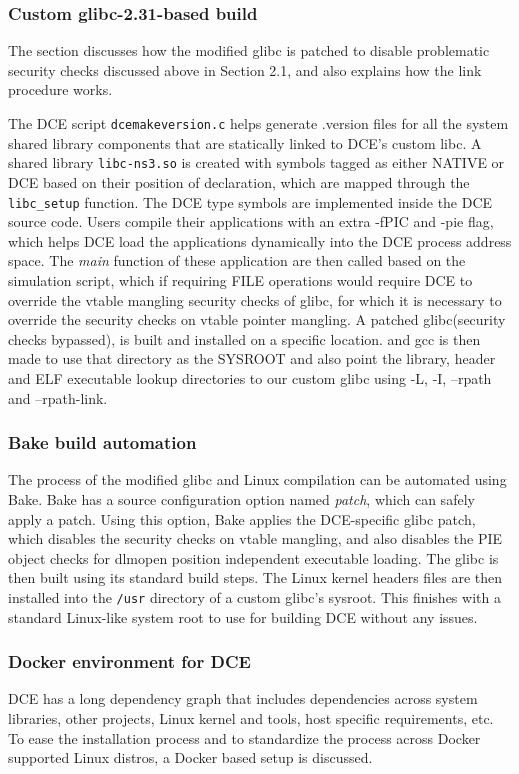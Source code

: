 \documentclass{sig-alternate}
\begin{document}
\subsubsection{Custom glibc-2.31-based build}
The section discusses how the modified glibc is patched to disable problematic security checks discussed above in Section 2.1, and also
explains how the link procedure works.

The DCE script \texttt{dcemakeversion.c} helps generate .version files for all the system shared library components that are statically linked to DCE's custom libc. A 
shared library \texttt{libc-ns3.so} is created with symbols tagged as either NATIVE or DCE based on their position of declaration, which are mapped through the 
\texttt{libc\_setup} function. The DCE type symbols are implemented 
inside the DCE source code. Users compile their applications with an extra -fPIC and -pie flag, which helps DCE load the applications dynamically into the DCE process 
address space. The \emph{main} function of these application are then called based on the simulation script, which if requiring FILE operations would require DCE to override the vtable 
mangling security checks of glibc, 
for which it is necessary to override the security checks on vtable pointer mangling. A patched glibc(security checks bypassed), is built and installed on a specific location. and gcc is then made 
to use that directory as the SYSROOT and also point the library, header and ELF executable lookup directories to our custom glibc using -L, -I, --rpath and --rpath-link.

\subsubsection{Bake build automation}
The process of the modified glibc and Linux compilation can be automated using Bake.
Bake has a source configuration option named \textit{patch}, which can safely apply a patch.
Using this option, Bake applies the DCE-specific glibc patch, which disables the security checks on vtable mangling, and also disables the 
PIE object checks for dlmopen position independent executable loading. The glibc is then built using its standard build steps. The Linux kernel headers
files are then installed into the \texttt{/usr} directory of a custom glibc's sysroot. This finishes with a standard Linux-like system root to use for building 
DCE without any issues. 

\subsubsection{Docker environment for DCE}
DCE has a long dependency graph that includes dependencies across 
system libraries, other projects, Linux kernel and tools, host specific requirements, etc. To ease the installation process and to standardize the process 
across Docker supported Linux distros, a Docker based setup is discussed.
\end{document}
